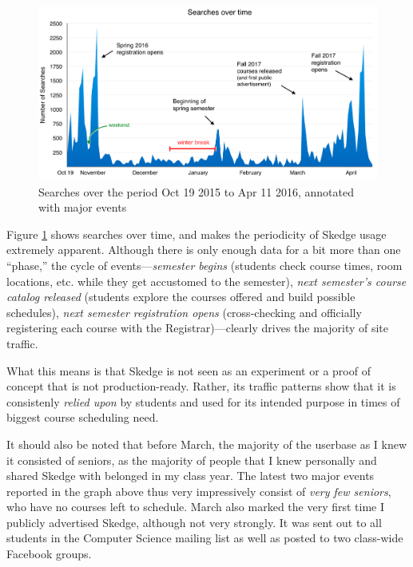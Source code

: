 \begin{figure}[H]
  \centering

  \includegraphics[width=1.0\textwidth]{images/graph/searches}

  \caption[Searches over the period Oct 19 2015 to Apr 11 2016]{Searches over the period Oct 19 2015 to Apr 11 2016, annotated with major events}
  \label{fig:searches}

\end{figure}

Figure \ref{fig:searches} shows searches over time, and makes the periodicity of Skedge usage extremely apparent. Although there is only enough data for a bit more than one ``phase,'' the cycle of events---\emph{semester begins} (students check course times, room locations, etc. while they get accustomed to the semester), \emph{next semester's course catalog released} (students explore the courses offered and build possible schedules), \emph{next semester registration opens} (cross-checking and officially registering each course with the Registrar)---clearly drives the majority of site traffic.

What this means is that Skedge is not seen as an experiment or a proof of concept that is not production-ready. Rather, its traffic patterns show that it is consistenly \emph{relied upon} by students and used for its intended purpose in times of biggest course scheduling need.

It should also be noted that before March, the majority of the userbase as I knew it consisted of seniors, as the majority of people that I knew personally and shared Skedge with belonged in my class year. The latest two major events reported in the graph above thus very impressively consist of \emph{very few seniors}, who have no courses left to schedule. March also marked the very first time I publicly advertised Skedge, although not very strongly. It was sent out to all students in the Computer Science mailing list as well as posted to two class-wide Facebook groups.

